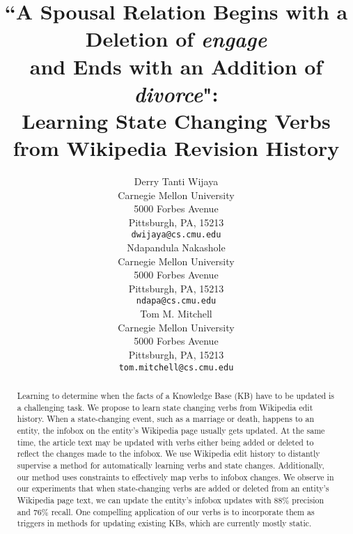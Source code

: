 \documentclass[11pt,a4paper]{article}
\title{``A Spousal Relation Begins with a Deletion of \textit{engage} \\and Ends with an Addition of \textit{divorce}": \\
Learning State Changing Verbs from Wikipedia Revision History}
\author{Derry Tanti Wijaya \\
  Carnegie Mellon University \\
  5000 Forbes Avenue \\
  Pittsburgh, PA, 15213 \\
  {\tt dwijaya@cs.cmu.edu} \\\And
   Ndapandula Nakashole \\
  Carnegie Mellon University \\
  5000 Forbes Avenue \\
  Pittsburgh, PA, 15213 \\
  {\tt ndapa@cs.cmu.edu} \\\And
  Tom M. Mitchell \\
  Carnegie Mellon University \\
  5000 Forbes Avenue \\
  Pittsburgh, PA, 15213 \\
  {\tt tom.mitchell@cs.cmu.edu} \\
  }
\date{}
\begin{document}
\maketitle


\begin{abstract}


Learning to determine when the facts of a Knowledge Base (KB) have to be updated is a challenging task.
We propose to learn state changing verbs from Wikipedia edit history. When a state-changing event,  such as a marriage or death,  happens to an entity, the  infobox on the entity's Wikipedia page usually gets  updated. At the same time, the  article text may be updated with verbs either being added or deleted to reflect the changes made to the infobox. We use Wikipedia edit history %
to distantly supervise a method for automatically learning verbs and state changes. Additionally, our method uses %
constraints
  to effectively map verbs to infobox changes. We observe in our experiments that when state-changing verbs are  added or deleted from an entity's Wikipedia  page text, we can update the entity's infobox updates with 88\% precision and 76\% recall.
One compelling  application of our verbs is to incorporate them as triggers in methods for   updating existing KBs, which are currently mostly static.

\end{abstract}








\end{document}
